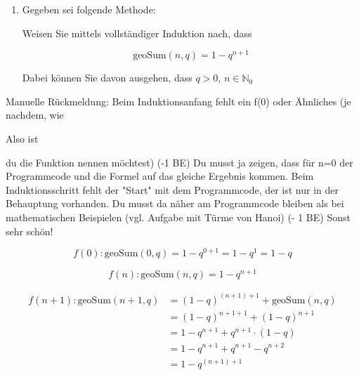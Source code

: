 \documentclass{lehramt-informatik-aufgabe}
\begin{document}
\begin{enumerate}
\item Gegeben sei folgende Methode:


Weisen Sie mittels vollständiger Induktion nach, dass

\begin{displaymath}
\text{geoSum}(n,q) = 1 - q^{n+1}
\end{displaymath}

Dabei können Sie davon ausgehen, dass $q > 0$, $ n \in \mathbb{N}_0$
\end{enumerate}

Manuelle Rückmeldung:
Beim Induktionsanfang fehlt ein f(0) oder Ähnliches (je nachdem, wie

Also ist

du die Funktion nennen möchtest) (-1 BE) Du musst ja zeigen, dass für
n=0 der Programmcode und die Formel auf das gleiche Ergebnis kommen.
Beim Induktionsschritt fehlt der "Start" mit dem Programmcode, der ist
nur in der Behauptung vorhanden. Du musst da näher am Programmcode
bleiben als bei mathematischen Beispielen (vgl. Aufgabe mit Türme von
Hanoi) (- 1 BE) Sonst sehr schön!

\begin{antwort}

\begin{displaymath}
f(0): \text{geoSum}(0, q) = 1 - q^{0+1} = 1 - q^1 = 1 - q
\end{displaymath}


\begin{displaymath}
f(n): \text{geoSum}(n, q) = 1 - q^{n+1}
\end{displaymath}


\begin{align*}
f(n+1): \text{geoSum}(n + 1, q)
& = (1 - q)^{(n + 1) + 1} + \text{geoSum}(n, q) \\
& = (1 - q)^{n + 1 + 1} + (1 - q)^{n + 1} \\
& = 1-q^{n+1} + q^{n+1} \cdot (1-q) \\
& = 1-q^{n+1}+q^{n+1}-q^{n+2} \\
& = 1-q^{(n+1)+1}
\end{align*}

\end{antwort}
\end{document}

